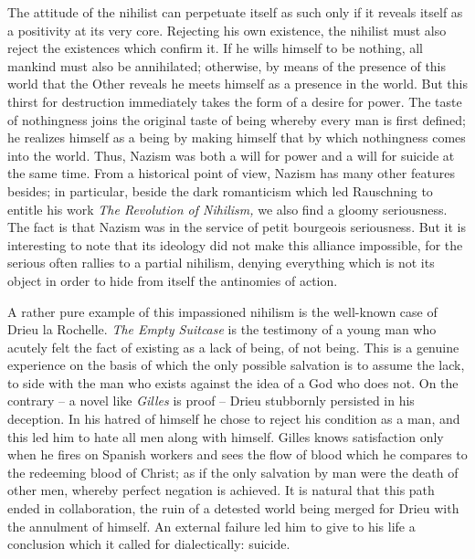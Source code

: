 \documentclass[11pt]{article}
\begin{document}
The attitude of the nihilist can perpetuate itself as such only if it reveals itself as a positivity at its very core. Rejecting his own existence, the nihilist must also reject the existences which confirm it. If he wills himself to be nothing, all mankind must also be annihilated; otherwise, by means of the presence of this world that the Other reveals he meets himself as a presence in the world. But this thirst for destruction immediately takes the form of a desire for power. The taste of nothingness joins the original taste of being whereby every man is first defined; he realizes himself as a being by making himself that by which nothingness comes into the world. Thus, Nazism was both a will for power and a will for suicide at the same time. From a historical point of view, Nazism has many other features besides; in particular, beside the dark romanticism which led Rauschning to entitle his work \textit{The Revolution of Nihilism,} we also find a gloomy seriousness. The fact is that Nazism was in the service of petit bourgeois seriousness. But it is interesting to note that its ideology did not make this alliance impossible, for the serious often rallies to a partial nihilism, denying everything which is not its object in order to hide from itself the antinomies of action.

A rather pure example of this impassioned nihilism is the well-known case of Drieu la Rochelle. \textit{The Empty Suitcase} is the testimony of a young man who acutely felt the fact of existing as a lack of being, of not being. This is a genuine experience on the basis of which the only possible salvation is to assume the lack, to side with the man who exists against the idea of a God who does not. On the contrary – a novel like \textit{Gilles} is proof – Drieu stubbornly persisted in his deception. In his hatred of himself he chose to reject his condition as a man, and this led him to hate all men along with himself. Gilles knows satisfaction only when he fires on Spanish workers and sees the flow of blood which he compares to the redeeming blood of Christ; as if the only salvation by man were the death of other men, whereby perfect negation is achieved. It is natural that this path ended in collaboration, the ruin of a detested world being merged for Drieu with the annulment of himself. An external failure led him to give to his life a conclusion which it called for dialectically: suicide.
\end{document}
